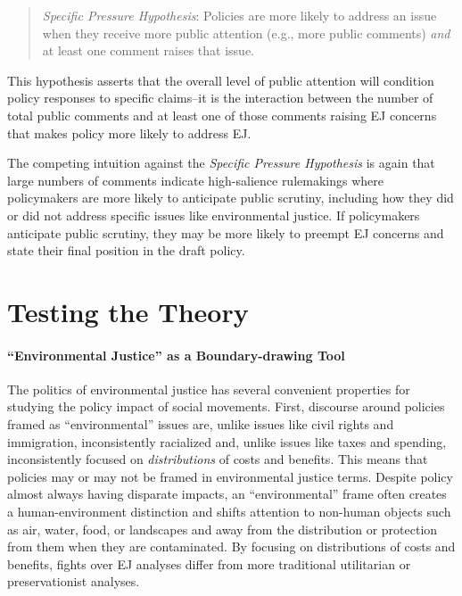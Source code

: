 \documentclass[
      12pt,
        ]{article}
\begin{document}
\begin{quote}
\emph{Specific Pressure Hypothesis}: Policies are more likely to address an issue when they receive more public attention (e.g., more public comments) \emph{and} at least one comment raises that issue.
\end{quote}

This hypothesis asserts that the overall level of public attention will condition policy responses to specific claims--it is the interaction between the number of total public comments and at least one of those comments raising EJ concerns that makes policy more likely to address EJ.

The competing intuition against the \emph{Specific Pressure Hypothesis} is again that large numbers of comments indicate high-salience rulemakings where policymakers are more likely to anticipate public scrutiny, including how they did or did not address specific issues like environmental justice. If policymakers anticipate public scrutiny, they may be more likely to preempt EJ concerns and state their final position in the draft policy.

\hypertarget{testing-the-theory}{%
\section{Testing the Theory}\label{testing-the-theory}}

\hypertarget{environmental-justice-as-a-boundary-drawing-tool}{%
\paragraph{``Environmental Justice'' as a Boundary-drawing Tool}\label{environmental-justice-as-a-boundary-drawing-tool}}

The politics of environmental justice has several convenient properties for studying the policy impact of social movements. First, discourse around policies framed as ``environmental'' issues are, unlike issues like civil
rights and immigration, inconsistently racialized and, unlike issues
like taxes and spending, inconsistently focused on \emph{distributions} of
costs and benefits. This means that policies may or may not be framed in environmental justice terms. Despite policy almost always having disparate impacts, an ``environmental'' frame often creates a human-environment distinction and shifts attention to non-human objects such as air, water, food, or landscapes and away from the distribution or
protection from them when they are contaminated. By focusing on distributions of costs and benefits, fights over EJ analyses differ from more traditional utilitarian or preservationist analyses.
\end{document}
